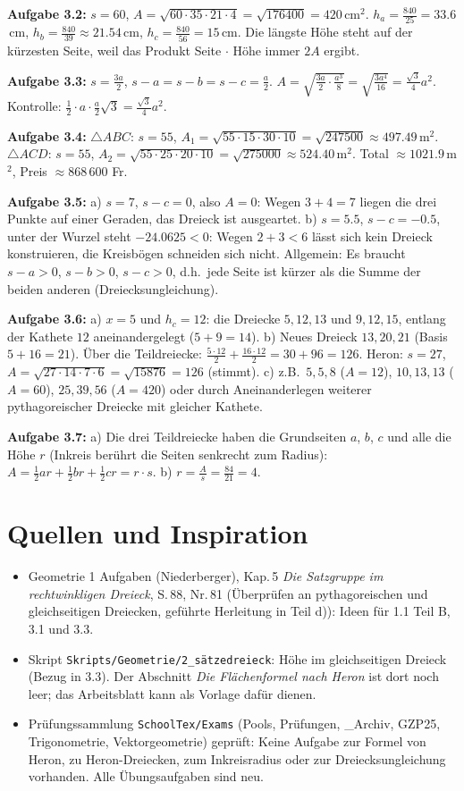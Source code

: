 \documentclass[11pt,oneside]{article}
\begin{document}
\textbf{Aufgabe 3.2:} $s=60$, $A=\sqrt{60\cdot35\cdot21\cdot4}=\sqrt{176400}=420$\,cm$^2$. $h_a=\frac{840}{25}=33.6$\,cm, $h_b=\frac{840}{39}\approx21.54$\,cm, $h_c=\frac{840}{56}=15$\,cm. Die längste Höhe steht auf der kürzesten Seite, weil das Produkt Seite $\cdot$ Höhe immer $2A$ ergibt.

\textbf{Aufgabe 3.3:} $s=\frac{3a}{2}$, $s-a=s-b=s-c=\frac a2$. $A=\sqrt{\frac{3a}{2}\cdot\frac{a^3}{8}}=\sqrt{\frac{3a^4}{16}}=\frac{\sqrt3}{4}a^2$. Kontrolle: $\frac12\cdot a\cdot\frac a2\sqrt3=\frac{\sqrt3}{4}a^2$.

\textbf{Aufgabe 3.4:} $\triangle ABC$: $s=55$, $A_1=\sqrt{55\cdot15\cdot30\cdot10}=\sqrt{247500}\approx497.49$\,m$^2$. $\triangle ACD$: $s=55$, $A_2=\sqrt{55\cdot25\cdot20\cdot10}=\sqrt{275000}\approx524.40$\,m$^2$. Total $\approx1021.9$\,m$^2$, Preis $\approx868\,600$ Fr.

\textbf{Aufgabe 3.5:} a) $s=7$, $s-c=0$, also $A=0$: Wegen $3+4=7$ liegen die drei Punkte auf einer Geraden, das Dreieck ist ausgeartet. b) $s=5.5$, $s-c=-0.5$, unter der Wurzel steht $-24.0625<0$: Wegen $2+3<6$ lässt sich kein Dreieck konstruieren, die Kreisbögen schneiden sich nicht. Allgemein: Es braucht $s-a>0$, $s-b>0$, $s-c>0$, d.h.\ jede Seite ist kürzer als die Summe der beiden anderen (Dreiecksungleichung).

\textbf{Aufgabe 3.6:} a) $x=5$ und $h_c=12$: die Dreiecke $5,12,13$ und $9,12,15$, entlang der Kathete $12$ aneinandergelegt ($5+9=14$). b) Neues Dreieck $13,20,21$ (Basis $5+16=21$). Über die Teildreiecke: $\frac{5\cdot12}{2}+\frac{16\cdot12}{2}=30+96=126$. Heron: $s=27$, $A=\sqrt{27\cdot14\cdot7\cdot6}=\sqrt{15876}=126$ (stimmt). c) z.B.\ $5,5,8$ ($A=12$), $10,13,13$ ($A=60$), $25,39,56$ ($A=420$) oder durch Aneinanderlegen weiterer pythagoreischer Dreiecke mit gleicher Kathete.

\textbf{Aufgabe 3.7:} a) Die drei Teildreiecke haben die Grundseiten $a$, $b$, $c$ und alle die Höhe $r$ (Inkreis berührt die Seiten senkrecht zum Radius): $A=\frac12ar+\frac12br+\frac12cr=r\cdot s$. b) $r=\frac{A}{s}=\frac{84}{21}=4$.

\section*{Quellen und Inspiration}
\begin{itemize}[itemsep=0pt]
	\item Geometrie 1 Aufgaben (Niederberger), Kap.\,5 \textit{Die Satzgruppe im rechtwinkligen Dreieck}, S.\,88, Nr.\,81 (Überprüfen an pythagoreischen und gleichseitigen Dreiecken, geführte Herleitung in Teil d)): Ideen für 1.1 Teil B, 3.1 und 3.3.
	\item Skript \texttt{Skripts/Geometrie/2\_sätzedreieck}: Höhe im gleichseitigen Dreieck (Bezug in 3.3). Der Abschnitt \textit{Die Flächenformel nach Heron} ist dort noch leer; das Arbeitsblatt kann als Vorlage dafür dienen.
	\item Prüfungssammlung \texttt{SchoolTex/Exams} (Pools, Prüfungen, \_Archiv, GZP25, Trigonometrie, Vektorgeometrie) geprüft: Keine Aufgabe zur Formel von Heron, zu Heron-Dreiecken, zum Inkreisradius oder zur Dreiecksungleichung vorhanden. Alle Übungsaufgaben sind neu.
\end{itemize}
\end{document}
